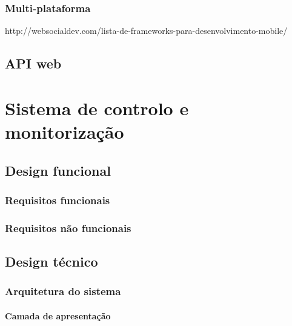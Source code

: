 \subsection{Multi-plataforma}



http://websocialdev.com/lista-de-frameworks-para-desenvolvimento-mobile/




\section{API web}


\chapter{Sistema de controlo e monitorização}


\section{Design funcional}











\subsection{Requisitos funcionais}

\subsection{Requisitos não funcionais}







\section{Design técnico}



\subsection{Arquitetura do sistema}



\subsubsection{Camada de apresentação}


